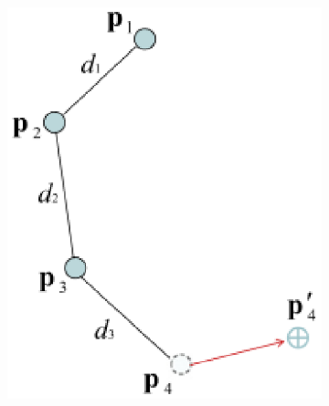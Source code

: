 \begin{figure}
\begin{subfigure}{0.2\textwidth}
        \subcaption{}
        \label{fig:fabrik1}
    \end{subfigure}
    \begin{subfigure}{0.2\textwidth}
        \centering
        \includegraphics[width=\linewidth]{grafika/fabrik_iteration2.eps}
        \subcaption{}
        \label{fig:fabrik2}
    \end{subfigure}
    \begin{subfigure}{0.2\textwidth}
        \centering

\end{subfigure}
\end{figure}
